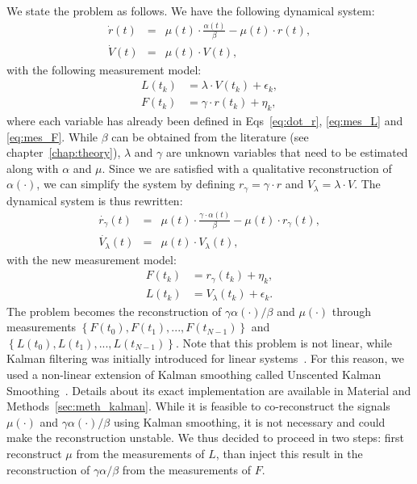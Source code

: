 We state the problem as follows.
We have the following dynamical system:
\begin{eqnarray}
\dot{r}(t) &=& \mu (t) \cdot \frac{\alpha(t)}{\beta} - \mu (t) \cdot r(t),\\
\dot{V}(t) &=& \mu (t) \cdot V(t),
\end{eqnarray}
with the following measurement model:
\begin{eqnarray}
L(t_k) &= \lambda \cdot V(t_k) + \epsilon_k,\\
F(t_k) &= \gamma \cdot r(t_k) + \eta_k,
\end{eqnarray}
where each variable has already been defined in Eqs~\ref{eq:dot_r}, \ref{eq:mes_L} and \ref{eq:mes_F}.
While $\beta$ can be obtained from the literature (see chapter~\ref{chap:theory}), $\lambda$ and $\gamma$ are unknown variables that need to be estimated along with $\alpha$ and $\mu$.
Since we are satisfied with a qualitative reconstruction of $\alpha (\cdot)$, we can simplify the system by defining $r_\gamma = \gamma \cdot r$ and $V_\lambda = \lambda \cdot V$.
The dynamical system is thus rewritten:
\begin{eqnarray}
\dot{r_\gamma}(t) &=& \mu (t) \cdot\frac{\gamma \cdot \alpha(t)}{\beta} - \mu (t) \cdot r_\gamma (t),\label{eq:r_prob}\\
\dot{V_\lambda}(t) &=& \mu (t) \cdot V_\lambda (t),\label{eq:V_prob}
\end{eqnarray}
with the new measurement model:
\begin{eqnarray}
F(t_k) &= r_\gamma (t_k) + \eta_k,\label{eq:F_prob}\\
L(t_k) &= V_\lambda(t_k) + \epsilon_k.\label{eq:L_prob}
\end{eqnarray}
The problem becomes the reconstruction of $\gamma \alpha (\cdot) / \beta$ and $\mu (\cdot)$ through measurements $\left\{ F(t_0), F(t_1), ..., F(t_{N-1}) \right\}$ and $\left\{L(t_0), L(t_1), ..., L(t_{N-1}) \right\}$.
Note that this problem is not linear, while Kalman filtering was initially introduced for linear systems~\cite{kalman_new_1960,kailath_linear_2000}.
For this reason, we used a non-linear extension of Kalman smoothing called Unscented Kalman Smoothing~\cite{julier_new_1997,jazwinski_stochastic_2007}.
Details about its exact implementation are available in Material and Methods~\ref{sec:meth_kalman}.
While it is feasible to co-reconstruct the signals $\mu (\cdot)$ and $\gamma \alpha (\cdot) / \beta$ using Kalman smoothing, it is not necessary and could make the reconstruction unstable.
We thus decided to proceed in two steps: first reconstruct $\mu$ from the measurements of $L$, than inject this result in the reconstruction of $\gamma \alpha / \beta$ from the measurements of $F$.

